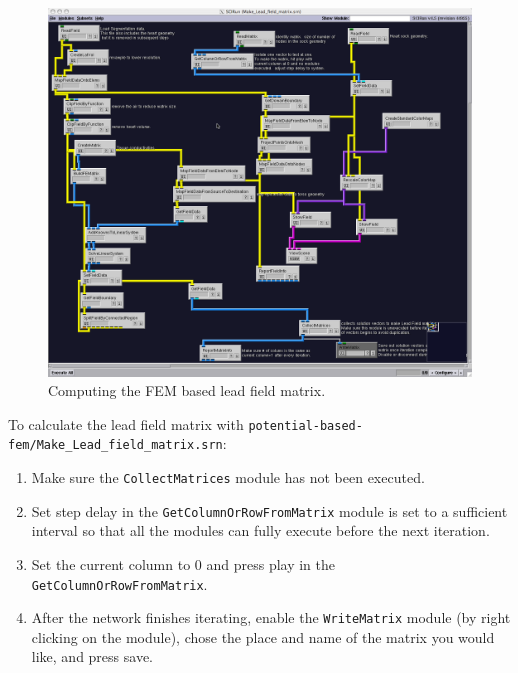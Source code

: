 \begin{figure}[H]
\begin{center}
\includegraphics[width=\textwidth]{ECGToolkitGuide_figures/leadfield_pot_fem.png}
\caption{Computing the FEM based lead field matrix.}
\label{fig:mat_pot_fem}
\end{center}
\end{figure}

To calculate the lead field matrix with {\tt potential-based-fem/Make\_Lead\_field\_matrix.srn}:
\begin{enumerate}
\item{Make sure the {\tt CollectMatrices} module has not been executed.}
\item{Set step delay in the {\tt GetColumnOrRowFromMatrix} module is set to a sufficient interval so that all the modules can fully execute before the next iteration.}
\item{Set the current column to 0 and press play in the {\tt GetColumnOrRowFromMatrix}.}
\item{After the network finishes iterating, enable the {\tt WriteMatrix} module (by right clicking on the module), chose the place and name of the matrix you would like, and press save.  }
\end{enumerate}

